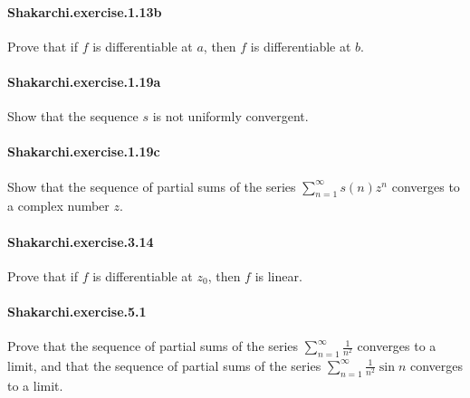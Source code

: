 \documentclass{article}
\begin{document}
\paragraph{Shakarchi.exercise.1.13b} Prove that if $f$ is differentiable at $a$, then $f$ is differentiable at $b$.

\paragraph{Shakarchi.exercise.1.19a} Show that the sequence $s$ is not uniformly convergent.

\paragraph{Shakarchi.exercise.1.19c} Show that the sequence of partial sums of the series $\sum_{n=1}^\infty s(n) z^n$ converges to a complex number $z$.




\paragraph{Shakarchi.exercise.3.14} Prove that if $f$ is differentiable at $z_0$, then $f$ is linear.

\paragraph{Shakarchi.exercise.5.1} Prove that the sequence of partial sums of the series $\sum_{n=1}^\infty \frac{1}{n^2}$ converges to a limit, and that the sequence of partial sums of the series $\sum_{n=1}^\infty \frac{1}{n^2} \sin n$ converges to a limit.
\end{document}
